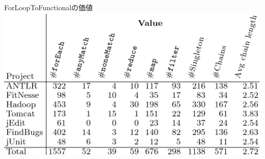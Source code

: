 \begin{frame}{ForLoopToFunctionalの価値}
\includegraphics[width=\textwidth,height=.8\textheight,keepaspectratio]{forvalue}
\end{frame}

